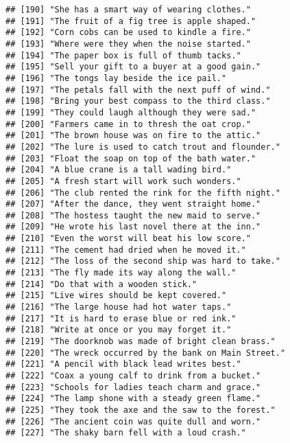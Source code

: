 \documentclass[
]{article}
\begin{document}
\begin{verbatim}
## [190] "She has a smart way of wearing clothes."                  
## [191] "The fruit of a fig tree is apple shaped."                 
## [192] "Corn cobs can be used to kindle a fire."                  
## [193] "Where were they when the noise started."                  
## [194] "The paper box is full of thumb tacks."                    
## [195] "Sell your gift to a buyer at a good gain."                
## [196] "The tongs lay beside the ice pail."                       
## [197] "The petals fall with the next puff of wind."              
## [198] "Bring your best compass to the third class."              
## [199] "They could laugh although they were sad."                 
## [200] "Farmers came in to thresh the oat crop."                  
## [201] "The brown house was on fire to the attic."                
## [202] "The lure is used to catch trout and flounder."            
## [203] "Float the soap on top of the bath water."                 
## [204] "A blue crane is a tall wading bird."                      
## [205] "A fresh start will work such wonders."                    
## [206] "The club rented the rink for the fifth night."            
## [207] "After the dance, they went straight home."                
## [208] "The hostess taught the new maid to serve."                
## [209] "He wrote his last novel there at the inn."                
## [210] "Even the worst will beat his low score."                  
## [211] "The cement had dried when he moved it."                   
## [212] "The loss of the second ship was hard to take."            
## [213] "The fly made its way along the wall."                     
## [214] "Do that with a wooden stick."                             
## [215] "Live wires should be kept covered."                       
## [216] "The large house had hot water taps."                      
## [217] "It is hard to erase blue or red ink."                     
## [218] "Write at once or you may forget it."                      
## [219] "The doorknob was made of bright clean brass."             
## [220] "The wreck occurred by the bank on Main Street."           
## [221] "A pencil with black lead writes best."                    
## [222] "Coax a young calf to drink from a bucket."                
## [223] "Schools for ladies teach charm and grace."                
## [224] "The lamp shone with a steady green flame."                
## [225] "They took the axe and the saw to the forest."             
## [226] "The ancient coin was quite dull and worn."                
## [227] "The shaky barn fell with a loud crash."                   

\end{verbatim}
\end{document}
